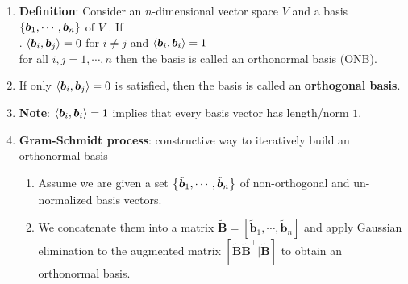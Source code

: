 \begin{enumerate}
    \item \textbf{Definition}: Consider an $n$-dimensional vector space $V$ and a basis $\left\{\bm{b}_1, \cdots , \bm{b}_n\right\}$ of $V$ . 
    If
    \hfill \cite{mfml/book/mml/Deisenroth-Faisal-Ong}
    \\
    .\hfill
    $\langle\bm{b}_i, \bm{b}_j\rangle = 0$ for $i \neq j$ and $\langle\bm{b}_i, \bm{b}_i\rangle = 1$
    \hfill \cite{mfml/book/mml/Deisenroth-Faisal-Ong}
    \\
    for all $i, j = 1, \cdots , n$ then the basis is called an orthonormal basis (ONB).
    \hfill \cite{mfml/book/mml/Deisenroth-Faisal-Ong}

    \item If only $\langle\bm{b}_i, \bm{b}_j\rangle = 0$ is satisfied, then the basis is called an \textbf{orthogonal basis}.
    \hfill \cite{mfml/book/mml/Deisenroth-Faisal-Ong}

    \item \textbf{Note}: $\langle\bm{b}_i, \bm{b}_i\rangle = 1$ implies that every basis vector has length/norm $1$.
    \hfill \cite{mfml/book/mml/Deisenroth-Faisal-Ong}

    \item \textbf{Gram-Schmidt process}: constructive way to iteratively build an orthonormal basis
    \hfill \cite{mfml/book/mml/Deisenroth-Faisal-Ong}
    \begin{enumerate}
        \item Assume we are given a set $\left\{\tilde{\bm{b}}_1, \cdots ,\tilde{\bm{b}}_n\right\}$ of non-orthogonal and un-normalized basis vectors.
        \hfill \cite{mfml/book/mml/Deisenroth-Faisal-Ong}

        \item We concatenate them into a matrix $\tilde{\bm{B}} = [\tilde{\bm{b}}_1, \cdots ,\tilde{\bm{b}}_n]$ and apply Gaussian elimination to the augmented matrix $[\tilde{\bm{B}} \tilde{\bm{B}}^\top|\tilde{\bm{B}}]$ to obtain an orthonormal basis. 
        \hfill \cite{mfml/book/mml/Deisenroth-Faisal-Ong}
    \end{enumerate}
\end{enumerate}




























